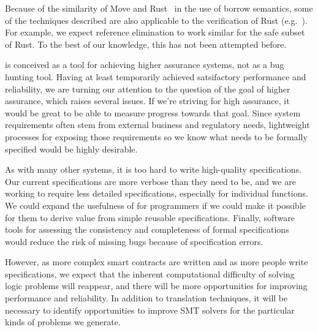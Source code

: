 Because of the similarity of Move and Rust~\cite{rust} in the use of borrow
semantics, some of the techniques described are also applicable to the
verification of Rust (e.g.~\cite{prusti,smack,nopanic,crust}).  For example, we
expect reference elimination to work similar for the safe subset of Rust.  To
the best of our knowledge, this has not been attempted before.



\MVP is conceived as a tool for achieving higher assurance systems, not as a bug
hunting tool. Having at least temporarily achieved satsifactory performance and
reliability, we are turning our attention to the question of the goal of higher
assurance, which raises several issues.  If we're striving for high assurance,
it would be great to be able to measure progress towards that goal.  Since
system requirements often stem from external business and regulatory needs,
lightweight processes for exposing those requirements so we know what needs to
be formally specified would be highly desirable.

As with many other systems, it is too hard to write high-quality specifications.
Our current specifications are more verbose than they need to be, and we are
working to require less detailed specifications, especially for individual
functions.  We could expand the usefulness of \MVP for programmers if we could
make it possible for them to derive value from simple reusable specifications.
Finally, software tools for assessing the consistency and completeness of formal
specifications would reduce the risk of missing bugs because of specification
errors.

However, as more complex smart contracts are written and as more people write
specifications, we expect that the inherent computational difficulty of solving
logic problems will reappear, and there will be more opportunities for improving
performance and reliability.  In addition to translation techniques, it will be
necessary to identify opportunities to improve SMT solvers for the particular
kinds of problems we generate.


